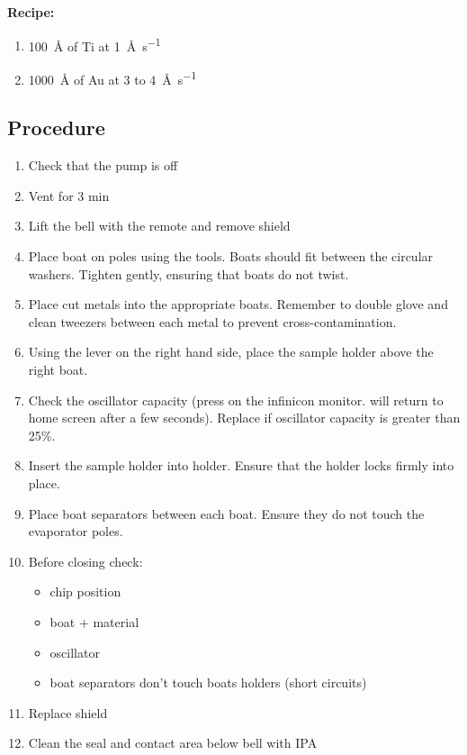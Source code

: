 \documentclass[12pt,a4paper]{report}
\begin{document}
\textbf{Recipe: }
\begin{enumerate}[label=\protect\nth{\value*} layer: ,noitemsep,leftmargin=10em]
\item \SI{100}{\angstrom} of Ti at \SI{1}{\angstrom\per\second}
\item \SI{1000}{\angstrom} of Au at 3 to \SI{4}{\angstrom\per\second}
\end{enumerate}

\newpage


\subsection{Procedure}
\begin{enumerate}
\item Check that the pump is off
\item Vent for 3 min
\item Lift the bell with the remote and remove shield
\item Place boat on poles using the tools. Boats should fit between the circular washers. Tighten gently, ensuring that
boats do not twist.
\item Place cut metals into the appropriate boats. Remember to double glove and clean tweezers between each metal
to prevent cross-contamination.
\item Using the lever on the right hand side, place the sample holder above the right boat.
\item Check the oscillator capacity (press  on the infinicon monitor. will return to home screen after a few seconds). Replace if
oscillator capacity is greater than 25\%.
\item Insert the sample holder into holder. Ensure that the holder locks firmly into place.
\item Place boat separators between each boat. Ensure they do not touch the evaporator poles.
\item Before closing check:
\begin{itemize}[nolistsep,noitemsep]
  \item chip position
  \item boat + material
  \item oscillator
  \item boat separators don't touch boats holders (short circuits)
\end{itemize}
\item Replace shield
\item Clean the seal and contact area below bell with IPA

\end{enumerate}
\end{document}
